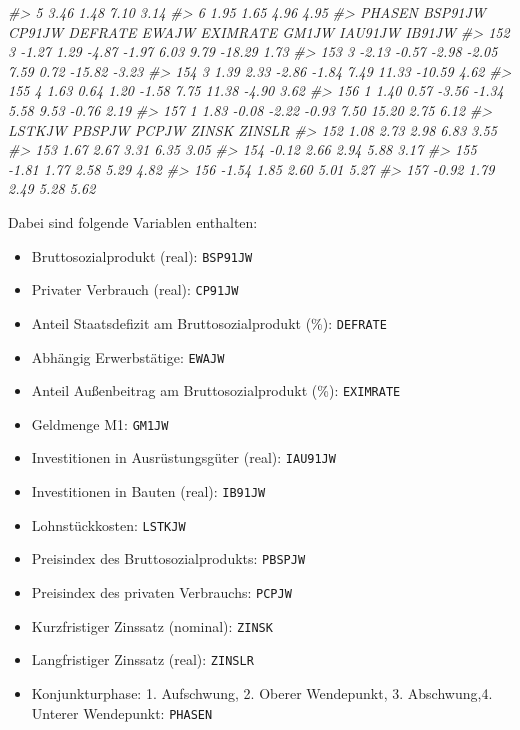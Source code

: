 \documentclass[12pt,]{book}
\makeatletter
\newenvironment{Shaded}{\begin{snugshade}}{\end{snugshade}}
\newcommand{\CommentTok}[1]{\textcolor[rgb]{0.56,0.35,0.01}{\textit{{#1}}}}
\providecommand{\tightlist}{%
  \setlength{\itemsep}{0pt}\setlength{\parskip}{0pt}}
\newenvironment{kframe}{%
\medskip{}
\setlength{\fboxsep}{.8em}
 \def\at@end@of@kframe{}%
 \ifinner\ifhmode%
  \def\at@end@of@kframe{\end{minipage}}%
  \begin{minipage}{\columnwidth}%
 \fi\fi%
 \def\FrameCommand##1{\hskip\@totalleftmargin \hskip-\fboxsep
 \colorbox{shadecolor}{##1}\hskip-\fboxsep
     \hskip-\linewidth \hskip-\@totalleftmargin \hskip\columnwidth}%
 \MakeFramed {\advance\hsize-\width
   \@totalleftmargin\z@ \linewidth\hsize
   \@setminipage}}%
 {\par\unskip\endMakeFramed%
 \at@end@of@kframe}
\renewenvironment{Shaded}{\begin{kframe}}{\end{kframe}}
\makeatother
\begin{document}
\begin{Shaded}
\begin{Highlighting}[]
\CommentTok{#> 5   3.46  1.48  7.10   3.14}
\CommentTok{#> 6   1.95  1.65  4.96   4.95}
\CommentTok{#>     PHASEN BSP91JW CP91JW DEFRATE EWAJW EXIMRATE GM1JW IAU91JW IB91JW}
\CommentTok{#> 152      3   -1.27   1.29   -4.87 -1.97     6.03  9.79  -18.29   1.73}
\CommentTok{#> 153      3   -2.13  -0.57   -2.98 -2.05     7.59  0.72  -15.82  -3.23}
\CommentTok{#> 154      3    1.39   2.33   -2.86 -1.84     7.49 11.33  -10.59   4.62}
\CommentTok{#> 155      4    1.63   0.64    1.20 -1.58     7.75 11.38   -4.90   3.62}
\CommentTok{#> 156      1    1.40   0.57   -3.56 -1.34     5.58  9.53   -0.76   2.19}
\CommentTok{#> 157      1    1.83  -0.08   -2.22 -0.93     7.50 15.20    2.75   6.12}
\CommentTok{#>     LSTKJW PBSPJW PCPJW ZINSK ZINSLR}
\CommentTok{#> 152   1.08   2.73  2.98  6.83   3.55}
\CommentTok{#> 153   1.67   2.67  3.31  6.35   3.05}
\CommentTok{#> 154  -0.12   2.66  2.94  5.88   3.17}
\CommentTok{#> 155  -1.81   1.77  2.58  5.29   4.82}
\CommentTok{#> 156  -1.54   1.85  2.60  5.01   5.27}
\CommentTok{#> 157  -0.92   1.79  2.49  5.28   5.62}
\end{Highlighting}
\end{Shaded}

Dabei sind folgende Variablen enthalten:

\begin{itemize}
\tightlist
\item
  Bruttosozialprodukt (real): \texttt{BSP91JW}
\item
  Privater Verbrauch (real): \texttt{CP91JW}
\item
  Anteil Staatsdefizit am Bruttosozialprodukt (\%): \texttt{DEFRATE}
\item
  Abhängig Erwerbstätige: \texttt{EWAJW}
\item
  Anteil Außenbeitrag am Bruttosozialprodukt (\%): \texttt{EXIMRATE}
\item
  Geldmenge M1: \texttt{GM1JW}
\item
  Investitionen in Ausrüstungsgüter (real): \texttt{IAU91JW}
\item
  Investitionen in Bauten (real): \texttt{IB91JW}
\item
  Lohnstückkosten: \texttt{LSTKJW}
\item
  Preisindex des Bruttosozialprodukts: \texttt{PBSPJW}
\item
  Preisindex des privaten Verbrauchs: \texttt{PCPJW}
\item
  Kurzfristiger Zinssatz (nominal): \texttt{ZINSK}
\item
  Langfristiger Zinssatz (real): \texttt{ZINSLR}
\item
  Konjunkturphase: 1. Aufschwung, 2. Oberer Wendepunkt, 3. Abschwung,4.
  Unterer Wendepunkt: \texttt{PHASEN}
\end{itemize}
\end{document}
